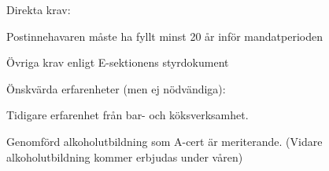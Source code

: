 \documentclass[10pt]{article}
\begin{document}
Direkta krav:
\begin{dashlist}
    \item Postinnehavaren måste ha fyllt minst 20 år inför mandatperioden
    \item Övriga krav enligt E-sektionens styrdokument
\end{dashlist}

Önskvärda erfarenheter (men ej nödvändiga):
\begin{dashlist}
    \item Tidigare erfarenhet från bar- och köksverksamhet.
    \item Genomförd alkoholutbildning som A-cert är meriterande. (Vidare alkoholutbildning kommer erbjudas under våren)
\end{dashlist}
\end{document}
